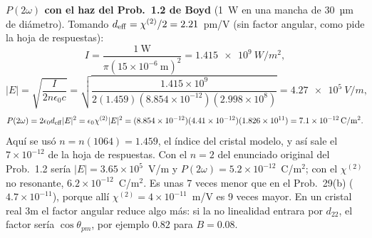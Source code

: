  \textbf{$P(2\omega)$ con el haz del Prob.~1.2 de Boyd} (1~W en una mancha de 30~µm de diámetro). Tomando $d_{\rm eff}=\chi^{(2)}/2=2.21$~pm/V (sin
factor angular, como pide la hoja de respuestas):
\[
I=\frac{1\ \mathrm W}{\pi(15\times10^{-6}\ \mathrm m)^2}=\SI{1.415e9}{W/m^2},
\]
\[
|E|=\sqrt{\frac{I}{2n\epsilon_0c}}=\sqrt{\frac{1.415\times10^9}{2(1.459)(8.854\times10^{-12})(2.998\times10^8)}}=\SI{4.27e5}{V/m},
\]
\[
P(2\omega)=2\epsilon_0d_{\rm eff}|E|^2=\epsilon_0\chi^{(2)}|E|^2=(8.854\times10^{-12})(4.41\times10^{-12})(1.826\times10^{11})=\SI{7.1e-12}{C/m^2}.
\]
Aquí se usó $n=n(1064)=1.459$, el índice del cristal modelo, y así sale el $7\times10^{-12}$ de la hoja de respuestas. Con el $n=2$ del enunciado original del
Prob.~1.2 sería $|E|=3.65\times10^5$~V/m y $P(2\omega)=5.2\times10^{-12}$~C/m$^2$; con el $\chi^{(2)}$ no resonante, $6.2\times10^{-12}$~C/m$^2$. Es unas 7 veces
menor que en el Prob.~29(b) ($4.7\times10^{-11}$), porque allí $\chi^{(2)}=4\times10^{-11}$~m/V es 9 veces mayor. En un cristal real 3m el factor angular reduce
algo más: si la no linealidad entrara por $d_{22}$, el factor sería $\cos\theta_{pm}$, por ejemplo $0.82$ para $B=0.08$.


